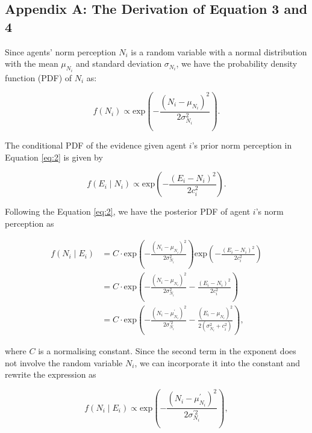 \documentclass[
  11pt,
]{article}
\begin{document}
\hypertarget{appendix-a-the-derivation-of-equation-3-and-4}{%
\subsection*{Appendix A: The Derivation of Equation 3 and
4}\label{appendix-a-the-derivation-of-equation-3-and-4}}

Since agents' norm perception \(N_i\) is a random variable with a normal
distribution with the mean \(\mu_{N_i}\) and standard deviation
\(\sigma_{N_i}\), we have the probability density function (PDF) of
\(N_i\) as:

\begin{equation*}
f(N_i) \propto \text{exp}(-\frac{(N_i - \mu_{N_i})^2}{2\sigma_{N_i}^2}).
\end{equation*}

The conditional PDF of the evidence given agent \(i\)'s prior norm
perception in Equation \ref{eq:2} is given by

\begin{equation*}
f(E_i \mid N_i) \propto \text{exp}(-\frac{(E_i - N_i)^2}{2c_i^2}).
\end{equation*}

Following the Equation \ref{eq:2}, we have the posterior PDF of agent
\(i\)'s norm perception as

\begin{equation*}
  \begin{aligned}
    f(N_i \mid E_i) &= C \cdot \text{exp}(-\frac{(N_i - \mu_{N_i})^2}{2\sigma_{N_i}^2}) \text{exp}(- \frac{(E_i - N_i)^2}{2c_i^2})\\
      &= C \cdot \text{exp}(-\frac{(N_i - \mu_{N_i})^2}{2\sigma_{N_i}^2} - \frac{(E_i - N_i)^2}{2c_i^2})\\
      &= C \cdot \text{exp}(- \frac{(N_i - \mu_{N_i}^{\prime})^2}{2\sigma_{N_i}^{\prime2}} - \frac{(E_i - \mu_{N_i})^2}{2(\sigma_{N_i}^2 + c_i^2)}),
  \end{aligned}
\end{equation*}

where \(C\) is a normalising constant. Since the second term in the
exponent does not involve the random variable \(N_i\), we can
incorporate it into the constant and rewrite the expression as

\begin{equation*}
  f(N_i \mid E_i) \propto \text{exp}(- \frac{(N_i - \mu_{N_i}^{\prime})^2}{2\sigma_{N_i}^{\prime2}}),
\end{equation*}
\end{document}
